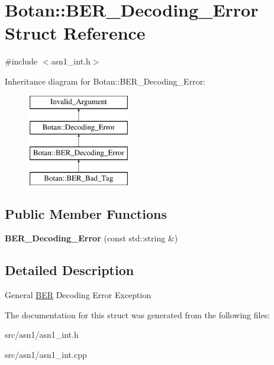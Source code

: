 \hypertarget{structBotan_1_1BER__Decoding__Error}{\section{Botan\-:\-:B\-E\-R\-\_\-\-Decoding\-\_\-\-Error Struct Reference}
\label{structBotan_1_1BER__Decoding__Error}
}


{\ttfamily \#include $<$asn1\-\_\-int.\-h$>$}

Inheritance diagram for Botan\-:\-:B\-E\-R\-\_\-\-Decoding\-\_\-\-Error\-:\begin{figure}[H]
\begin{center}
\leavevmode
\includegraphics[height=4.000000cm]{structBotan_1_1BER__Decoding__Error}
\end{center}
\end{figure}
\subsection*{Public Member Functions}
\begin{DoxyCompactItemize}
\item 
\hypertarget{structBotan_1_1BER__Decoding__Error_aeab6d32168d9cb4257a641687b5d5a05}{{\bfseries B\-E\-R\-\_\-\-Decoding\-\_\-\-Error} (const std\-::string \&)}\label{structBotan_1_1BER__Decoding__Error_aeab6d32168d9cb4257a641687b5d5a05}

\end{DoxyCompactItemize}


\subsection{Detailed Description}
General \hyperlink{namespaceBotan_1_1BER}{B\-E\-R} Decoding Error Exception 

The documentation for this struct was generated from the following files\-:\begin{DoxyCompactItemize}
\item 
src/asn1/asn1\-\_\-int.\-h\item 
src/asn1/asn1\-\_\-int.\-cpp\end{DoxyCompactItemize}
